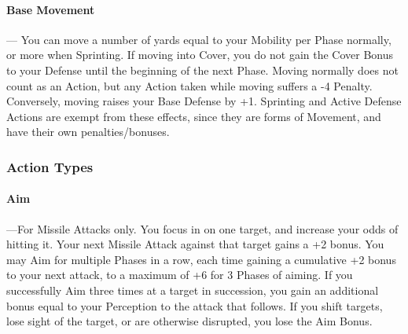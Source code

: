 \documentclass[oneside,11pt,english]{book}
\begin{document}
\paragraph{Base Movement}---\quad 
You can move a number of yards equal to your Mobility per Phase normally, or more
when Sprinting. If moving into Cover, you do not gain the Cover Bonus to your Defense until the
beginning of the next Phase.
Moving normally does not count as an Action, but any Action taken while moving suffers a -4 Penalty.
Conversely, moving raises your Base Defense by +1. Sprinting and Active Defense Actions are exempt
from these effects, since they are forms of Movement, and have their own penalties/bonuses.
\subsubsection{Action Types}
\paragraph{Aim}---\quad For Missile Attacks only. You focus in on one target, and increase your odds of hitting it. Your next
Missile Attack against that target gains a +2 bonus. You may Aim for multiple Phases in a row, each time
gaining a cumulative +2 bonus to your next attack, to a maximum of +6 for 3 Phases of aiming. If you
successfully Aim three times at a target in succession, you gain an additional bonus equal to your
Perception to the attack that follows. If you shift targets, lose sight of the target, or are otherwise
disrupted, you lose the Aim Bonus.
\end{document}
